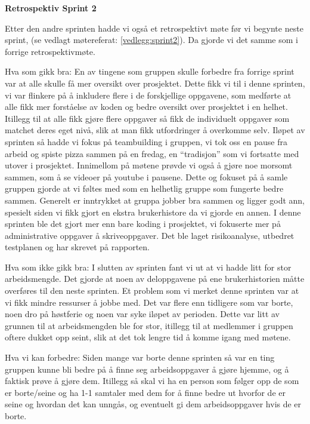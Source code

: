 \documentclass[12pt,a4paper,norsk]{article}
\begin{document}
\bigskip \noindent \textbf{Retrospektiv Sprint 2}
\par Etter den andre sprinten hadde vi også et retrospektivt møte før vi begynte neste sprint, (se vedlagt møtereferat: \ref{vedlegg:sprint2}). Da gjorde vi det samme som i forrige retrospektivmøte.

Hva som gikk bra:
En av tingene som gruppen skulle forbedre fra forrige sprint var at alle skulle få mer oversikt over prosjektet. Dette fikk vi til i denne sprinten, vi var flinkere på å inkludere flere i de forskjellige oppgavene, som medførte at alle fikk mer forståelse av koden og bedre oversikt over prosjektet i en helhet. Itillegg til at alle fikk gjøre flere oppgaver så fikk de individuelt oppgaver som matchet deres eget nivå, slik at man fikk utfordringer å overkomme selv.
Iløpet av sprinten så hadde vi fokus på teambuilding i gruppen, vi tok oss en pause fra arbeid og spiste pizza sammen på en fredag, en “tradisjon” som vi fortsatte med utover i prosjektet. Innimellom på møtene prøvde vi også å gjøre noe morsomt sammen, som å se videoer på youtube i pausene. Dette og fokuset på å samle gruppen gjorde at vi føltes med som en helhetlig gruppe som fungerte bedre sammen. 
Generelt er inntrykket at gruppa jobber bra sammen og ligger godt ann, spesielt siden vi fikk gjort en ekstra brukerhistore da vi gjorde en annen. 
I denne sprinten ble det gjort mer enn bare koding i prosjektet, vi fokuserte mer på administrative oppgaver å skriveoppgaver. Det ble laget risikoanalyse, utbedret testplanen og har skrevet på rapporten. 

Hva som ikke gikk bra:
I slutten av sprinten fant vi ut at vi hadde litt for stor arbeidsmengde. Det gjorde at noen av deloppgavene på ene brukerhistorien måtte overføres til den neste sprinten. 
Et problem som vi merket denne sprinten var at vi fikk mindre ressurser å jobbe med. Det var flere enn tidligere som var borte, noen dro på høstferie og noen var syke iløpet av perioden. Dette var litt av grunnen til at arbeidsmengden ble for stor, itillegg til at medlemmer i gruppen oftere dukket opp seint, slik at det tok lengre tid å komme igang med møtene. 

Hva vi kan forbedre:
Siden mange var borte denne sprinten så var en ting gruppen kunne bli bedre på å finne seg arbeidsoppgaver å gjøre hjemme, og å faktisk prøve å gjøre dem.
Itillegg så skal vi ha en person som følger opp de som er borte/seine og ha 1-1 samtaler med dem for å finne bedre ut hvorfor de er seine og hvordan det kan unngås, og eventuelt gi dem arbeidsoppgaver hvis de er borte.
\end{document}
